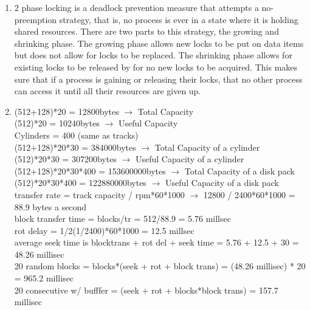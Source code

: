 \documentclass[12pt]{article}
\begin{document}
\begin{enumerate}
	\item 2 phase locking is a deadlock prevention measure that attempts a no-preemption strategy, that is, no process is ever in a state where it is holding shared resources.
There are two parts to this strategy, the growing and shrinking phase. The growing phase allows new locks to be put on data items but does not allow for locks to be replaced.
The shrinking phase allows for existing locks to be released by for no new locks to be acquired. This makes sure that if a process is gaining or releasing their locks,
that no other process can access it until all their resources are given up.

	\item (512+128)*20 = 12800bytes $\rightarrow$ Total Capacity\\
(512)*20 = 10240bytes $\rightarrow$ Useful Capacity\\
Cylinders = 400 (same as tracks)\\
(512+128)*20*30 = 384000bytes $\rightarrow$ Total Capacity of a cylinder\\
(512)*20*30 = 307200bytes $\rightarrow$ Useful Capacity of a cylinder\\
(512+128)*20*30*400 = 153600000bytes $\rightarrow$ Total Capacity of a disk pack\\
(512)*20*30*400 = 122880000bytes $\rightarrow$ Useful Capacity of a disk pack\\
transfer rate = track capacity / rpm*60*1000 $\rightarrow$ 12800 / 2400*60*1000 = 88.9 bytes a second\\
block transfer time = blocks/tr = 512/88.9 = 5.76 millsec\\
rot delay = 1/2(1/2400)*60*1000 = 12.5 millsec\\
average seek time is blocktrans + rot del + seek time = 5.76 + 12.5 + 30 = 48.26 millisec\\
20 random blocks = blocks*(seek + rot + block trans) = (48.26 millisec) * 20 = 965.2 millisec\\
20 consecutive w/ bufffer = (seek + rot + blocks*block trans) = 157.7 millisec\\
	

\end{enumerate}
\end{document}
